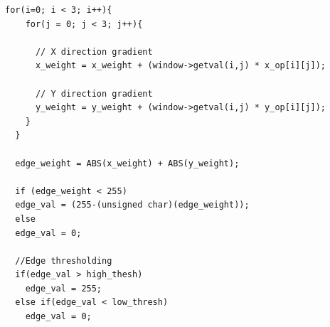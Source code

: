 \begin{lstlisting}[caption=Sobel operator implementation, captionpos=b, label=lst:sobeloperator]
  for(i=0; i < 3; i++){
    for(j = 0; j < 3; j++){

      // X direction gradient
      x_weight = x_weight + (window->getval(i,j) * x_op[i][j]);
      
      // Y direction gradient
      y_weight = y_weight + (window->getval(i,j) * y_op[i][j]);
    }
  }
  
  edge_weight = ABS(x_weight) + ABS(y_weight);

  if (edge_weight < 255)
  edge_val = (255-(unsigned char)(edge_weight));
  else
  edge_val = 0;

  //Edge thresholding
  if(edge_val > high_thesh)
    edge_val = 255;
  else if(edge_val < low_thresh)
    edge_val = 0;
\end{lstlisting}

